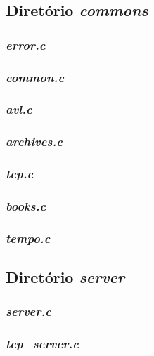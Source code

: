 \documentclass[a4paper,10pt]{article}
\begin{document}
\subsection{Diretório \textit{commons}}
\subsubsection{\label{itm:error.c}\emph{error.c}}

\subsubsection{\label{itm:common.c}\emph{common.c}}

\subsubsection{\label{itm:avl.c}\emph{avl.c}}

\subsubsection{\label{itm:archives.c}\emph{archives.c}}

\subsubsection{\label{itm:tcp.c}\emph{tcp.c}}

\subsubsection{\label{itm:books.c}\emph{books.c}}

\subsubsection{\label{itm:tempo.c}\emph{tempo.c}}


\subsection{Diretório \textit{server}}
\subsubsection{\label{itm:server.c}\emph{server.c}}

\subsubsection{\label{itm:tcp_server.c}\emph{tcp\_server.c}}

\end{document}
